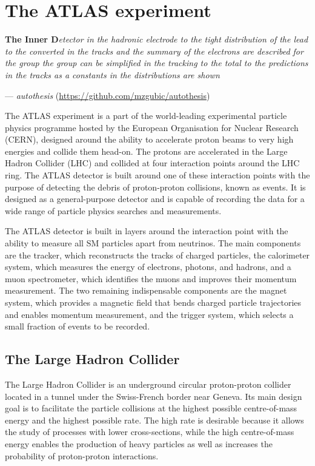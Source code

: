 \chapter{The ATLAS experiment}

\textbf{The Inner D}\textit{etector in the hadronic electrode to the tight distribution of the lead to the converted in the tracks and the summary of the electrons are described for the group the group can be simplified in the tracking to the total to the predictions in the tracks as a constants in the distributions are shown}
\vspace{5mm}
\begin{flushright}
--- \textit{autothesis} (\url{https://github.com/mzgubic/autothesis})
\end{flushright}

\thispagestyle{empty}
\newpage

\noindent
The ATLAS experiment is a part of the world-leading experimental particle
physics programme hosted by the European Organisation for Nuclear Research
(CERN), designed around the ability to accelerate proton beams to very high
energies and collide them head-on. The protons are accelerated in the Large
Hadron Collider (LHC) and collided at four interaction points
around the LHC ring. The ATLAS detector is built around one of these
interaction points with the purpose of detecting the debris of
proton-proton collisions, known as events. It is designed as a general-purpose detector
and is capable of recording the data for a wide range of particle physics
searches and measurements.

The ATLAS detector is built in layers around the interaction point with
the ability to measure all SM particles apart from neutrinos. The main
components are the tracker, which reconstructs the tracks of charged 
particles, the calorimeter system, which measures the energy of
electrons, photons, and hadrons, and a muon spectrometer, which identifies
the muons and improves their momentum measurement. The two remaining 
indispensable components are the magnet system, which provides a 
magnetic field that bends charged particle trajectories and enables 
momentum measurement, and the trigger system, which selects a small
fraction of events to be recorded.

\section{The Large Hadron Collider}

The Large Hadron Collider is an underground circular proton-proton collider
located in a tunnel under the Swiss-French border near Geneva. Its main
design goal is to facilitate the particle collisions at the highest possible
centre-of-mass energy and the highest possible rate. The high rate is
desirable because it allows the study of processes with lower cross-sections, while
the high centre-of-mass energy enables the production of heavy particles as
well as increases the probability of proton-proton interactions.

